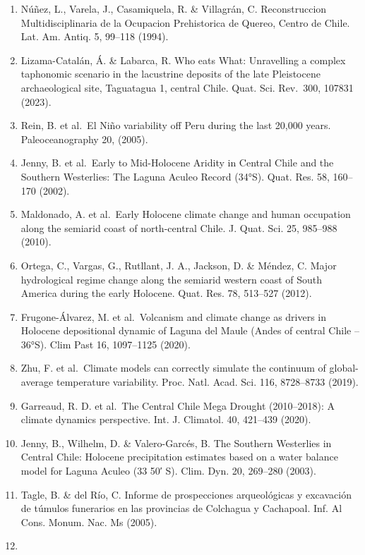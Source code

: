 \documentclass[
]{article}
\begin{document}
\begin{enumerate}
  use of space in Central Chile. Chungara Rev.~Antropol. Chil. 47,
  53--65 (2015).
\item
  Núñez, L., Varela, J., Casamiquela, R. \& Villagrán, C. Reconstruccion
  Multidisciplinaria de la Ocupacion Prehistorica de Quereo, Centro de
  Chile. Lat. Am. Antiq. 5, 99--118 (1994).
\item
  Lizama-Catalán, Á. \& Labarca, R. Who eats What: Unravelling a complex
  taphonomic scenario in the lacustrine deposits of the late Pleistocene
  archaeological site, Taguatagua 1, central Chile. Quat. Sci. Rev.~300,
  107831 (2023).
\item
  Rein, B. et al.~El Niño variability off Peru during the last 20,000
  years. Paleoceanography 20, (2005).
\item
  Jenny, B. et al.~Early to Mid-Holocene Aridity in Central Chile and
  the Southern Westerlies: The Laguna Aculeo Record (34°S). Quat. Res.
  58, 160--170 (2002).
\item
  Maldonado, A. et al.~Early Holocene climate change and human
  occupation along the semiarid coast of north-central Chile. J. Quat.
  Sci. 25, 985--988 (2010).
\item
  Ortega, C., Vargas, G., Rutllant, J. A., Jackson, D. \& Méndez, C.
  Major hydrological regime change along the semiarid western coast of
  South America during the early Holocene. Quat. Res. 78, 513--527
  (2012).
\item
  Frugone-Álvarez, M. et al.~Volcanism and climate change as drivers in
  Holocene depositional dynamic of Laguna del Maule (Andes of central
  Chile -- 36°S). Clim Past 16, 1097--1125 (2020).
\item
  Zhu, F. et al.~Climate models can correctly simulate the continuum of
  global-average temperature variability. Proc. Natl. Acad. Sci. 116,
  8728--8733 (2019).
\item
  Garreaud, R. D. et al.~The Central Chile Mega Drought (2010--2018): A
  climate dynamics perspective. Int. J. Climatol. 40, 421--439 (2020).
\item
  Jenny, B., Wilhelm, D. \& Valero-Garcés, B. The Southern Westerlies in
  Central Chile: Holocene precipitation estimates based on a water
  balance model for Laguna Aculeo (33 50′ S). Clim. Dyn. 20, 269--280
  (2003).
\item
  Tagle, B. \& del Río, C. Informe de prospecciones arqueológicas y
  excavación de túmulos funerarios en las provincias de Colchagua y
  Cachapoal. Inf. Al Cons. Monum. Nac. Ms (2005).
\item

\end{enumerate}
\end{document}
